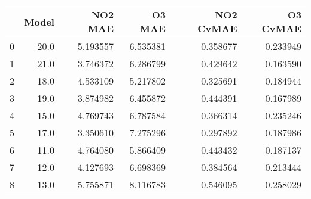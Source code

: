 \begin{tabular}{lrrrrr}
\toprule
{} &  Model &   NO2 MAE &    O3 MAE &  NO2 CvMAE &  O3 CvMAE \\
\midrule
0 &   20.0 &  5.193557 &  6.535381 &   0.358677 &  0.233949 \\
1 &   21.0 &  3.746372 &  6.286799 &   0.429642 &  0.163590 \\
2 &   18.0 &  4.533109 &  5.217802 &   0.325691 &  0.184944 \\
3 &   19.0 &  3.874982 &  6.455872 &   0.444391 &  0.167989 \\
4 &   15.0 &  4.769743 &  6.787584 &   0.366314 &  0.235246 \\
5 &   17.0 &  3.350610 &  7.275296 &   0.297892 &  0.187986 \\
6 &   11.0 &  4.764080 &  5.866409 &   0.443432 &  0.187137 \\
7 &   12.0 &  4.127693 &  6.698369 &   0.384564 &  0.213444 \\
8 &   13.0 &  5.755871 &  8.116783 &   0.546095 &  0.258029 \\
\bottomrule
\end{tabular}
